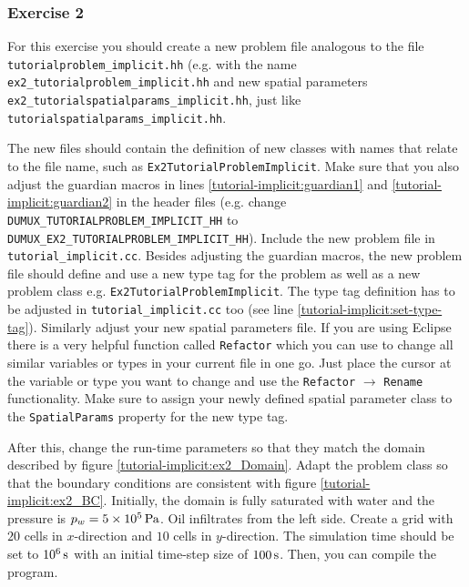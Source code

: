 \subsubsection{Exercise 2}
For this exercise you should create a new problem file analogous to
the file \texttt{tutorialproblem\_implicit.hh} (e.g. with the name
\texttt{ex2\_tutorialproblem\_implicit.hh} and new spatial parameters \texttt{ex2\_tutorial\allowbreak spatialparams\_implicit.hh},
just like \texttt{tutorialspatialparams\_implicit.hh}.

The new files should contain the definition of new classes with names
that relate to the file name, such as
\texttt{Ex2TutorialProblemImplicit}. Make sure that you also adjust the
guardian macros in lines \ref{tutorial-implicit:guardian1} and
\ref{tutorial-implicit:guardian2}
in the header files (e.g. change
\mbox{\texttt{DUMUX\_TUTORIALPROBLEM\_IMPLICIT\_HH}} to\\
\mbox{\texttt{DUMUX\_EX2\_TUTORIALPROBLEM\_IMPLICIT\_HH}}). Include the new problem file in \texttt{tutorial\_implicit.cc}.
Besides adjusting the guardian macros, the new problem file should define and
use a new type tag for the problem as well as a new problem class
e.g. \mbox{\texttt{Ex2TutorialProblemImplicit}}. The type tag definition has
to be adjusted in \texttt{tutorial\_implicit.cc} too (see line \ref{tutorial-implicit:set-type-tag}).
Similarly adjust your new spatial parameters file. If you are using Eclipse there is
a very helpful function called \texttt{Refactor} which you can use to change
all similar variables or types in your current file in one go. Just place the
cursor at the variable or type you want to change
and use the \texttt{Refactor} $\rightarrow$ \texttt{Rename} functionality. Make sure to assign your
newly defined spatial parameter class to the
\texttt{SpatialParams} property for the new
type tag.

After this, change the run-time parameters so that they match the
domain described by figure \ref{tutorial-implicit:ex2_Domain}. Adapt
the problem class so that the boundary conditions are consistent with
figure \ref{tutorial-implicit:ex2_BC}. Initially, the domain is fully
saturated with water and the pressure is $p_w = \unit[5 \times
10^5]{Pa}$. Oil infiltrates from the left side. Create a grid
with $20$ cells in $x$-direction and $10$ cells in $y$-direction. The
simulation time should be set to $\unit[10^6]{s}$ with an
initial time-step size of $\unit[100]{s}$. Then, you can compile the program.



